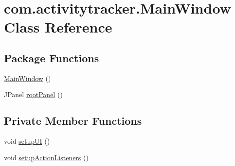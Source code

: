 \hypertarget{classcom_1_1activitytracker_1_1_main_window}{}\section{com.\+activitytracker.\+Main\+Window Class Reference}
\label{classcom_1_1activitytracker_1_1_main_window}
\subsection*{Package Functions}
\begin{DoxyCompactItemize}
\item 
\mbox{\hyperlink{classcom_1_1activitytracker_1_1_main_window_a77d0ebef154786202a165f496dc70065}{Main\+Window}} ()
\item 
J\+Panel \mbox{\hyperlink{classcom_1_1activitytracker_1_1_main_window_a62e9c6f477ccc5b93aff33abb567fde4}{root\+Panel}} ()
\end{DoxyCompactItemize}
\subsection*{Private Member Functions}
\begin{DoxyCompactItemize}
\item 
void \mbox{\hyperlink{classcom_1_1activitytracker_1_1_main_window_a53a019623a37b950473359fc625b6423}{setup\+UI}} ()
\item 
void \mbox{\hyperlink{classcom_1_1activitytracker_1_1_main_window_a76b3e8567b228ccd26f09c15ebaddb72}{setup\+Action\+Listeners}} ()
\end{DoxyCompactItemize}
